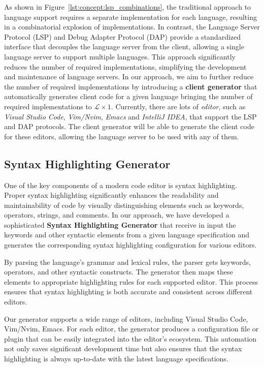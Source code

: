 As shown in Figure~\ref{lst:concept:lsp_combinations}, the traditional approach to language support requires a separate implementation for each language, resulting in a combinatorial explosion of implementations. In contrast, the Language Server Protocol (LSP) and Debug Adapter Protocol (DAP) provide a standardized interface that decouples the language server from the client, allowing a single language server to support multiple languages. This approach significantly reduces the number of required implementations, simplifying the development and maintenance of language servers.
In our approach, we aim to further reduce the number of required implementations by introducing a \textbf{client generator} that automatically generates client code for a given language bringing the number of required implementations to $\mathcal{L} \times 1$.
Currently, there are lots of \textit{editor}, such as \textit{Visual Studio Code}, \textit{Vim/Nvim}, \textit{Emacs} and \textit{IntelliJ IDEA}, that support the LSP and DAP protocols. The client generator will be able to generate the client code for these editors, allowing the language server to be used with any of them.

\subsection{Syntax Highlighting Generator}\label{subsec:concept:SyntaxHighlightingGenerator}

One of the key components of a modern code editor is syntax highlighting. Proper syntax highlighting significantly enhances the readability and maintainability of code by visually distinguishing elements such as keywords, operators, strings, and comments. In our approach, we have developed a sophisticated \textbf{Syntax Highlighting Generator} that receive in input the keywords and other syntactic elements from a given language specification and generates the corresponding syntax highlighting configuration for various editors.

By parsing the language's grammar and lexical rules, the parser gets keywords, operators, and other syntactic constructs. The generator then maps these elements to appropriate highlighting rules for each supported editor. This process ensures that syntax highlighting is both accurate and consistent across different editors.

Our generator supports a wide range of editors, including Visual Studio Code, Vim/Nvim, Emacs. For each editor, the generator produces a configuration file or plugin that can be easily integrated into the editor's ecosystem. This automation not only saves significant development time but also ensures that the syntax highlighting is always up-to-date with the latest language specifications.


